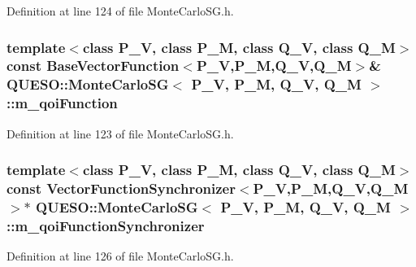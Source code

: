 Definition at line 124 of file Monte\-Carlo\-S\-G.\-h.

\hypertarget{class_q_u_e_s_o_1_1_monte_carlo_s_g_ae0c3b848d58b4f79d5e3741e70fbcd78}{
\subsubsection[{m\-\_\-qoi\-Function}]{\setlength{\rightskip}{0pt plus 5cm}template$<$class P\-\_\-\-V, class P\-\_\-\-M, class Q\-\_\-\-V, class Q\-\_\-\-M$>$ const {\bf Base\-Vector\-Function}$<$P\-\_\-\-V,P\-\_\-\-M,Q\-\_\-\-V,Q\-\_\-\-M$>$\& {\bf Q\-U\-E\-S\-O\-::\-Monte\-Carlo\-S\-G}$<$ P\-\_\-\-V, P\-\_\-\-M, Q\-\_\-\-V, Q\-\_\-\-M $>$\-::m\-\_\-qoi\-Function\hspace{0.3cm}{\ttfamily [private]}}}\label{class_q_u_e_s_o_1_1_monte_carlo_s_g_ae0c3b848d58b4f79d5e3741e70fbcd78}


Definition at line 123 of file Monte\-Carlo\-S\-G.\-h.

\hypertarget{class_q_u_e_s_o_1_1_monte_carlo_s_g_a5a55a6fa3562ec8253089ac242bc52ba}{
\subsubsection[{m\-\_\-qoi\-Function\-Synchronizer}]{\setlength{\rightskip}{0pt plus 5cm}template$<$class P\-\_\-\-V, class P\-\_\-\-M, class Q\-\_\-\-V, class Q\-\_\-\-M$>$ const {\bf Vector\-Function\-Synchronizer}$<$P\-\_\-\-V,P\-\_\-\-M,Q\-\_\-\-V,Q\-\_\-\-M$>$$\ast$ {\bf Q\-U\-E\-S\-O\-::\-Monte\-Carlo\-S\-G}$<$ P\-\_\-\-V, P\-\_\-\-M, Q\-\_\-\-V, Q\-\_\-\-M $>$\-::m\-\_\-qoi\-Function\-Synchronizer\hspace{0.3cm}{\ttfamily [private]}}}\label{class_q_u_e_s_o_1_1_monte_carlo_s_g_a5a55a6fa3562ec8253089ac242bc52ba}


Definition at line 126 of file Monte\-Carlo\-S\-G.\-h.

